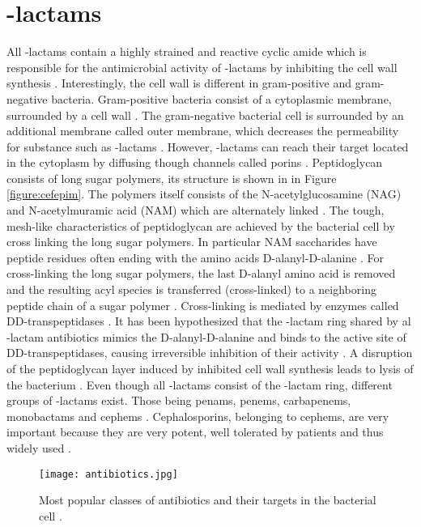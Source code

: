 \section{\textbeta-lactams}
All \textbeta-lactams contain a highly strained and reactive cyclic amide which is responsible for the antimicrobial activity of \textbeta-lactams by inhibiting the cell wall synthesis \cite{fisher_bacterial_2005}. Interestingly, the cell wall is different in gram-positive and gram-negative bacteria. Gram-positive bacteria consist of a cytoplasmic membrane, surrounded by a cell wall \cite{kapoor_action_2017}. The gram-negative bacterial cell is surrounded by an additional membrane called outer membrane, which decreases the permeability for substance such as \textbeta-lactams \cite{kapoor_action_2017}. However, \textbeta-lactams can reach their target located in the cytoplasm by diffusing though channels called porins \cite{kapoor_action_2017}. Peptidoglycan consists of long sugar polymers, its structure is shown in  in Figure \ref{figure:cefepim}. The polymers itself consists of the N-acetylglucosamine (NAG) and N-acetylmuramic acid (NAM) which are alternately linked \cite{fisher_bacterial_2005}. The tough, mesh-like characteristics of peptidoglycan are achieved by the bacterial cell by cross linking the long sugar polymers. In particular NAM saccharides have peptide residues often ending with the amino acids D-alanyl-D-alanine \cite{fisher_bacterial_2005}. For cross-linking the long sugar polymers, the last D-alanyl amino acid is removed and the resulting acyl species is transferred (cross-linked) to a neighboring peptide chain of a sugar polymer \cite{fisher_bacterial_2005}. Cross-linking is mediated by enzymes called DD-transpeptidases \cite{fisher_bacterial_2005}. It has been hypothesized that the \textbeta-lactam ring shared by al \textbeta-lactam antibiotics mimics the D-alanyl-D-alanine and binds to the active site of DD-transpeptidases, causing irreversible inhibition of their activity \cite{fisher_bacterial_2005}.  A disruption of the peptidoglycan layer induced by inhibited cell wall synthesis leads to lysis of the bacterium \cite{kapoor_action_2017}. Even though all \textbeta-lactams consist of the \textbeta-lactam ring, different groups of \textbeta-lactams exist. Those being penams, penems, carbapenems, monobactams and cephems \cite{beta-lactam_nodate}. Cephalosporins, belonging to cephems, are very important because they are very potent, well tolerated by patients and thus widely used \cite{dancer_problem_2001}.  
\begin{figure}
	\texttt{[image: antibiotics.jpg]}
	\caption{Most popular classes of antibiotics and their targets in the bacterial cell \cite{kapoor_action_2017}.}
	\label{figure:antibiotics}
\end{figure}

